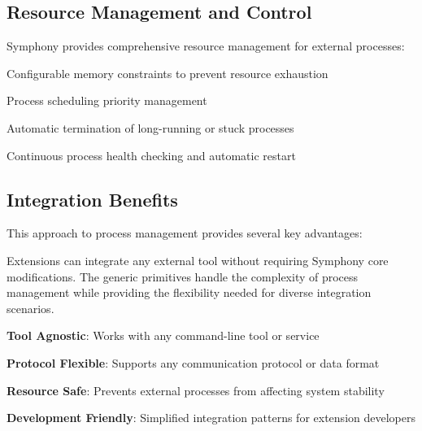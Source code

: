 \subsection*{Resource Management and Control}

Symphony provides comprehensive resource management for external processes:

\begin{description}[leftmargin=3cm,labelwidth=2.5cm]
    \item[\textbf{Memory Limits}] Configurable memory constraints to prevent resource exhaustion
    \item[\textbf{CPU Priority}] Process scheduling priority management
    \item[\textbf{Timeout Control}] Automatic termination of long-running or stuck processes
    \item[\textbf{Health Monitoring}] Continuous process health checking and automatic restart
\end{description}

\subsection*{Integration Benefits}

This approach to process management provides several key advantages:

\begin{successbox}
Extensions can integrate any external tool without requiring Symphony core modifications. The generic primitives handle the complexity of process management while providing the flexibility needed for diverse integration scenarios.
\end{successbox}

\begin{compactlist}
    \item \textbf{Tool Agnostic}: Works with any command-line tool or service
    \item \textbf{Protocol Flexible}: Supports any communication protocol or data format
    \item \textbf{Resource Safe}: Prevents external processes from affecting system stability
    \item \textbf{Development Friendly}: Simplified integration patterns for extension developers
\end{compactlist}

